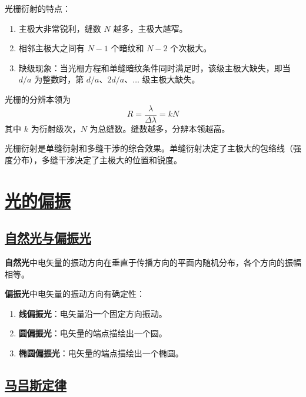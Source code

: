 光栅衍射的特点：
\begin{enumerate}
    \item 主极大非常锐利，缝数 $N$ 越多，主极大越窄。
    \item 相邻主极大之间有 $N-1$ 个暗纹和 $N-2$ 个次极大。
    \item 缺级现象：当光栅方程和单缝暗纹条件同时满足时，该级主极大缺失，即当 $d/a$ 为整数时，第 $d/a$、$2d/a$、$\ldots$ 级主极大缺失。
\end{enumerate}

\begin{definition}[光栅的分辨本领]
    光栅的分辨本领为
    \begin{equation}
        R = \frac{\lambda}{\Delta\lambda} = kN
    \end{equation}
    其中 $k$ 为衍射级次，$N$ 为总缝数。缝数越多，分辨本领越高。
\end{definition}

\begin{remark}
    光栅衍射是单缝衍射和多缝干涉的综合效果。单缝衍射决定了主极大的包络线（强度分布），多缝干涉决定了主极大的位置和锐度。
\end{remark}


\section{\protect\hyperlink{:}{光的偏振}}

\subsection{\protect\hyperlink{:}{自然光与偏振光}}

\textbf{自然光}中电矢量的振动方向在垂直于传播方向的平面内随机分布，各个方向的振幅相等。

\textbf{偏振光}中电矢量的振动方向有确定性：
\begin{enumerate}
    \item \textbf{线偏振光}：电矢量沿一个固定方向振动。
    \item \textbf{圆偏振光}：电矢量的端点描绘出一个圆。
    \item \textbf{椭圆偏振光}：电矢量的端点描绘出一个椭圆。
\end{enumerate}

\subsection{\protect\hyperlink{:}{马吕斯定律}}

